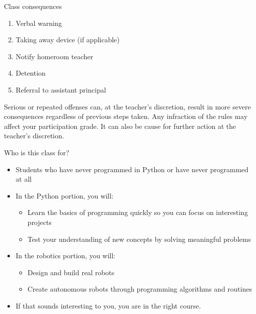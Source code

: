 \documentclass[aspectratio=169]{beamer}
\begin{document}
\begin{frame}{Class consequences}
    \begin{enumerate}[label={\arabic*.}]
        \item Verbal warning
        \item Taking away device (if applicable)
        \item Notify homeroom teacher
        \item Detention
        \item Referral to assistant principal
    \end{enumerate}
    \vspace{15pt}
    Serious or repeated offenses can, at the teacher's discretion, result in more severe consequences regardless of previous steps taken.
    Any infraction of the rules may affect your participation grade.
    It can also be cause for further action at the teacher's discretion.
\end{frame}




\begin{frame}{Who is this class for?}
    \begin{itemize}[label=--]
        \item Students who have never programmed in Python or have never programmed at all
        \item  In the Python portion, you will:
            \begin{itemize}[label=\(\blacktriangleright\),itemsep=5pt]
                \item Learn the basics of programming quickly so you can focus on interesting projects
                \item Test your understanding of new concepts by solving meaningful problems
            \end{itemize}
        \item In the robotics portion, you will:
            \begin{itemize}[label=\(\blacktriangleright\),itemsep=5pt]
                \item Design and build real robots
                \item Create autonomous robots through programming algorithms and routines
            \end{itemize}
        \item If that sounds interesting to you, you are in the right course.
    \end{itemize}
\end{frame}
\end{document}
